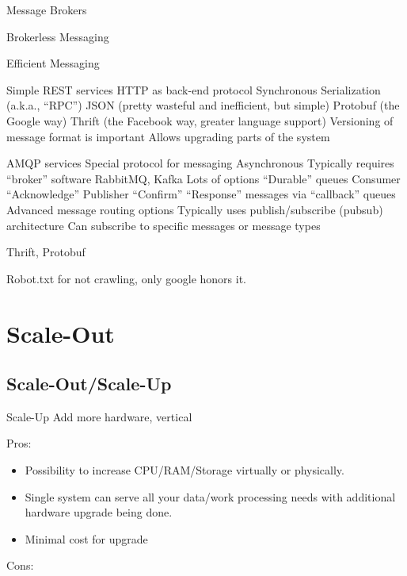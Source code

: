 \documentclass[fancy,11pt,titlestyle=display]{style/elegantbook}
\begin{document}
\begin{introduction}[Topics]
\item Message Brokers
\item Brokerless Messaging
\item Efficient Messaging
\end{introduction}

Simple REST services
HTTP as back-end protocol
Synchronous
Serialization (a.k.a., ``RPC'')
JSON (pretty wasteful and inefficient, but simple)
Protobuf (the Google way)
Thrift (the Facebook way, greater language support)
Versioning of message format is important
Allows upgrading parts of the system

AMQP services
Special protocol for messaging
Asynchronous
Typically requires ``broker'' software
RabbitMQ, Kafka
Lots of options
``Durable'' queues
Consumer ``Acknowledge''
Publisher ``Confirm''
``Response'' messages via ``callback'' queues
Advanced message routing options
Typically uses publish/subscribe (pubsub) architecture
Can subscribe to specific messages or message types

\begin{note}
Thrift, Protobuf
\end{note}
\begin{note}
	Robot.txt for not crawling, only google honors it.
\end{note}



 
\chapter{Scale-Out}


\section{Scale-Out/Scale-Up}


\begin{definition}{Scale-Up}{}
Add more hardware, vertical
\end{definition}
Pros:



\begin{itemize}
\item Possibility to increase CPU/RAM/Storage virtually or physically.

\item Single system can serve all your data/work processing needs with additional hardware upgrade being done.
\item Minimal cost for upgrade

\end{itemize}
    Cons:
\end{document}
